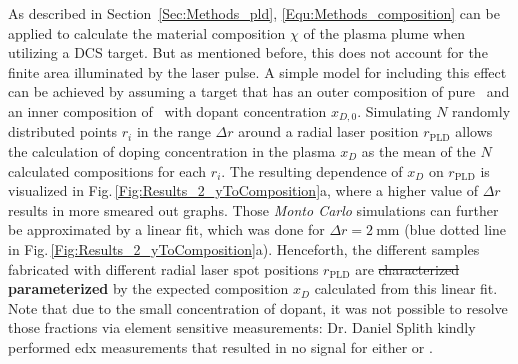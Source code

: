 As described in Section~\ref{Sec:Methods_pld}, \eqref{Equ:Methods_composition} can be applied to calculate the material composition $\chi$ of the plasma plume when utilizing a \gls{DCS} target.
But as mentioned before, this does not account for the finite area illuminated by the laser pulse.
A simple model for including this effect can be achieved by assuming a target that has an outer composition of pure \cro\ and an inner composition of \cro\ with dopant concentration $x_{D,0}$.
Simulating $N$ randomly distributed points $r_i$ in the range $\Delta r$ around a radial laser position $r_\mathrm{PLD}$ allows the calculation of doping concentration in the plasma $x_D$ as the mean of the $N$ calculated compositions for each $r_i$.
The resulting dependence of $x_D$ on $r_\mathrm{PLD}$ is visualized in Fig.\,\ref{Fig:Results_2_yToComposition}a, where a higher value of $\Delta r$ results in more smeared out graphs.
Those \emph{Monto Carlo} simulations can further be approximated by a linear fit, which was done for $\Delta r=\qty{2}{\mm}$ (blue dotted line in Fig.\,\ref{Fig:Results_2_yToComposition}a).
Henceforth, the different samples fabricated with different radial laser spot positions $r_\mathrm{PLD}$ are \sout{characterized} \textbf{parameterized} by the expected composition $x_D$ calculated from this linear fit.
Note that due to the small concentration of dopant, it was not possible to resolve those fractions via element sensitive measurements: Dr. Daniel Splith kindly performed \gls{edx} measurements that resulted in no signal for either  or .

